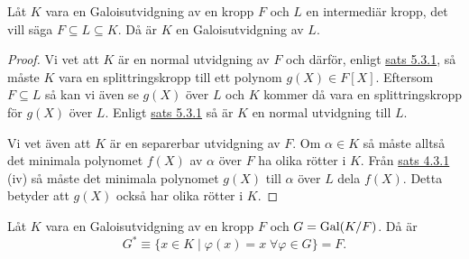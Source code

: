 \documentclass{article}
\newcommand{\gal}[0]{\textnormal{Gal}}
\theoremstyle{definition}
\begin{document}
\hypertarget{lemma9.0.2}{}
\begin{mylemma}{}{}
  Låt $K$ vara en Galoisutvidgning av en kropp $F$ och $L$ en intermediär kropp, det vill säga $F \subseteq L \subseteq K$. Då är $K$ en 
  Galoisutvidgning av $L$.
\end{mylemma}

\begin{proof}
  Vi vet att $K$ är en normal utvidgning av $F$ och därför, enligt \hyperlink{sats6.3.1}{sats 5.3.1}, så måste $K$ vara en splittringskropp till 
  ett polynom $g(X) \in F[X]$. Eftersom $F \subseteq L$ så kan vi även se $g(X)$ över $L$ och $K$ kommer då vara en splittringskropp för $g(X)$ över $L$. 
  Enligt \hyperlink{sats6.3.1}{sats 5.3.1} så är $K$ en normal utvidgning till $L$.

  Vi vet även att $K$ är en separerbar utvidgning av $F$. Om $\alpha \in K$ så måste alltså det minimala polynomet $f(X)$ av $\alpha$ över $F$ 
  ha olika rötter i $K$. Från \hyperlink{minpol}{sats 4.3.1} (iv) så måste det minimala polynomet $g(X)$ till $\alpha$ över $L$ dela $f(X)$.
  Detta betyder att $g(X)$ också har olika rötter i $K$.
\end{proof}

\hypertarget{lemma9.0.3}{}
\begin{mylemma}{}{}
  Låt $K$ vara en Galoisutvidgning av en kropp $F$ och $G = \gal(K/F)$. Då är 
  \[G^* \equiv \{x \in K \; | \; \varphi(x) = x \; \forall \varphi \in G\} = F.\]
\end{mylemma}
\end{document}
